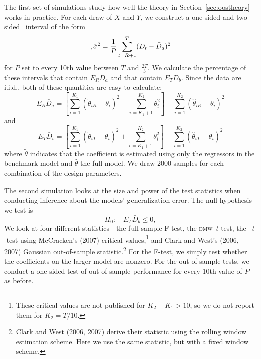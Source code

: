 \documentclass[11pt]{article}
\newcommand{\oosA}{\bar{D}_a}
\newcommand{\oosB}{\bar{D}_b}
\newcommand{\dmw}{\textsc{dmw}}
\begin{document}
The first set of simulations study how well the theory in
Section~\ref{sec:oostheory} works in practice.  For each draw of $X$
and $Y$, we construct a one-sided and two-sided \oos\ interval of the
form
\begin{equation*}
  [ \oosA - 1.28 \hat{\sigma}, \infty) \quad\text{and}\quad
  [ \oosA - 1.64 \hat{\sigma}, \oosA + 1.64\ \hat{\sigma}], \\
  \hat\sigma^2 = \frac1P \sum_{t=R+1}^T (D_t - \oosA)^{2}
\end{equation*}
for $P$ set to every 10th value between $T$ and $\frac{2T}{3}$.  We
calculate the percentage of these intervals that contain $E_R \oosA$
and that contain $E_T \oosB$.  Since the data are i.i.d., both of
these quantities are easy to calculate:
\begin{equation*}
  E_R \oosA = [\sum_{i=1}^{K_1} (\tilde{\theta}_{iR} - \theta_i)^2 +
  \sum_{i=K_1+1}^{K_2}\theta_i^2] - \sum_{i=1}^{K_2} (\hat{\theta}_{iR} -
  \theta_i)^2
\end{equation*}
and
\begin{equation*}
  E_T \oosB = [\sum_{i=1}^{K_1} (\tilde{\theta}_{iT} - \theta_i)^2 +
  \sum_{i=K_1+1}^{K_2}\theta_i^2] - \sum_{i=1}^{K_2} (\hat{\theta}_{iT} -
  \theta_i)^2
\end{equation*}
where $\tilde{\theta}$ indicates that the coefficient is estimated
using only the regressors in the benchmark model and $\hat{\theta}$
the full model.  We draw 2000 samples for each combination of the
design parameters.

The second simulation looks at the size and power of the test
statistics when conducting inference about the models' generalization
error.  The null hypothesis we test is 
\begin{equation}\label{eq:9}
  H_0:\quad E_T \oosB \leq 0,
\end{equation}
We look at four different statistics---the full-sample F-test, the
\dmw\ $t$-test, the
\oos\ $t$-test using McCracken's (2007)
critical values,\footnote{These critical values are not published for
  $K_2-K_1>10$, so we do not report them for $K_2 = T/10$.}
and Clark and West's (2006, 2007) Gaussian out-of-sample
statistic.\footnote{Clark and West (2006, 2007) derive their statistic
using the rolling window estimation scheme.  Here we use the same
statistic, but with a fixed window scheme.}
For the F-test, we simply test whether the coefficients on the larger
model are nonzero.  For the out-of-sample tests, we conduct a
one-sided test of out-of-sample performance for every 10th value of
$P$ as before.
\end{document}
